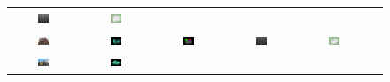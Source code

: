 \documentclass[10pt,twocolumn,letterpaper]{article}
\begin{document}
\begin{figure}[htbp]
\begin{center}
\begin{tabular}{cccccc}
\includegraphics[width=0.18\textwidth]{TH_9.png} &
\includegraphics[width=0.18\textwidth]{TH_3.png} \\
\includegraphics[width=0.18\textwidth]{real_cu_1.jpg} &
\includegraphics[width=0.18\textwidth]{real_cu_2.png} &
\includegraphics[width=0.18\textwidth]{real_cu_7.png} &
\includegraphics[width=0.18\textwidth]{real_cu_9.png} &
\includegraphics[width=0.18\textwidth]{real_cu_3.png} \\
\includegraphics[width=0.18\textwidth]{opernhaus_1.png} &
\includegraphics[width=0.18\textwidth]{opernhaus_2.png} &

\end{tabular}
\end{center}
\end{figure}
\end{document}

